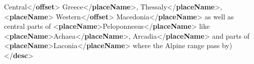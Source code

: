 \begin{shaded}
\hspace*{1em}\hspace*{1em}\hspace*{1em}\hspace*{1em}Central{</\textbf{offset}>} Greece{</\textbf{placeName}>},\mbox{}\newline 
\hspace*{1em}\hspace*{1em}Thessaly{</\textbf{placeName}>}, {<\textbf{placeName}>}\mbox{}\newline 
\hspace*{1em}\hspace*{1em}\hspace*{1em}\hspace*{1em}Western{</\textbf{offset}>} Macedonia{</\textbf{placeName}>} as well as\mbox{}\newline 
\hspace*{1em}\hspace*{1em}\hspace*{1em}\hspace*{1em}\hspace*{1em}\hspace*{1em} central parts of {<\textbf{placeName}>}Peloponnesus{</\textbf{placeName}>} like {<\textbf{placeName}>}Achaea{</\textbf{placeName}>},\mbox{}\newline 
\hspace*{1em}\hspace*{1em}Arcadia{</\textbf{placeName}>} and parts of {<\textbf{placeName}>}Laconia{</\textbf{placeName}>} where the Alpine range pass\mbox{}\newline 
\hspace*{1em}\hspace*{1em}\hspace*{1em}\hspace*{1em}\hspace*{1em}\hspace*{1em} by){</\textbf{desc}>}\mbox{}\newline 
\hspace*{1em}\mbox{}\newline 
\hspace*{1em}\mbox{}\newline 

\end{shaded}

